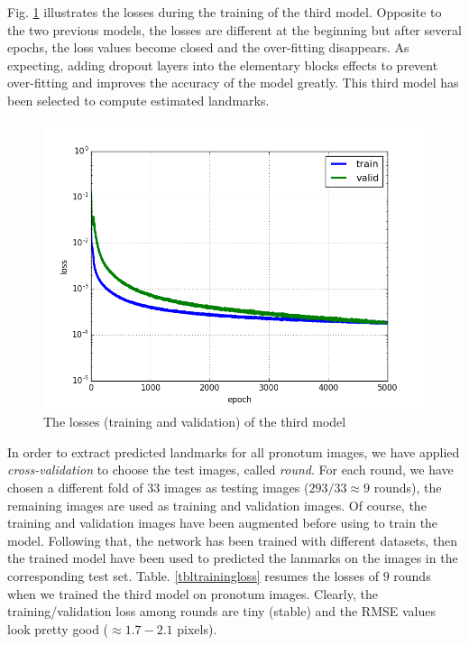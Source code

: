 \documentclass[review]{elsarticle}
\begin{document}
Fig. \ref{figloss3} illustrates the losses during the training of the third model. Opposite to the two previous models, the losses are different at the beginning but after several epochs, the loss values become closed and the over-fitting disappears. As expecting, adding dropout layers into the elementary blocks effects to prevent over-fitting and improves the accuracy of the model greatly. This third model has been selected to compute estimated landmarks.

\begin{figure}[htbp]
    \centering
    \includegraphics[scale=0.4]{images/model3_loss}
    \caption{The losses (training and validation) of the third model}
    \label{figloss3}
\end{figure}

In order to extract predicted landmarks for all pronotum images, we have applied \textit{cross-validation} to choose the test images, called \textit{round}. For each round, we have chosen a different fold of $33$ images as testing images ($293/33 \approx 9$ rounds), the remaining images are used as training and validation images. Of course, the training and validation images have been augmented before using to train the model. Following that, the network has been trained with different datasets, then the trained model have been used to predicted the lanmarks on the images in the corresponding test set. Table. \ref{tbltrainingloss} resumes the losses of $9$ rounds when we trained the third model on pronotum images. Clearly, the training/validation loss among rounds are tiny (stable) and the RMSE values look pretty good ($\approx 1.7 - 2.1$ pixels).
\end{document}
